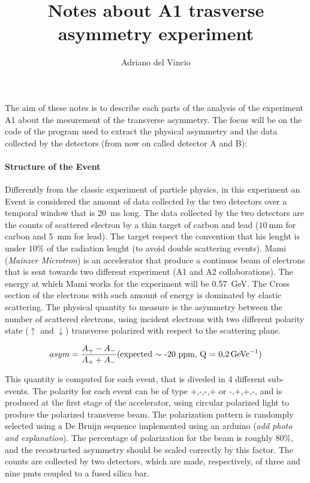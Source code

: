 \documentclass[10pt,a4paper]{article}
\author{Adriano del Vincio}
\title{Notes about A1 trasverse asymmetry experiment}
\begin{document}
\maketitle

\paragraph{}
The aim of these notes is to describe each parts of the analysis of the experiment A1 about the mesurement of the transverse asymmetry. The focus will be on the code of the program used to extract the physical asymmetry and  the data collected by the detectors (from now on called detector A and B): 


\paragraph{Structure of the Event}

Differently from the classic experiment of particle physics, in this experiment an Event is considered the amount of data collected by the two detectors over a temporal window that is \SI{20}{\milli\second} long. The data collected by the two detectors are the counts of scattered electron by a thin target of carbon and lead ($\SI{10}{\milli \meter}$ for carbon and \SI{5}{\milli \meter} for lead). The target respect the convention that his lenght is under $10\%$ of the radiation lenght (to avoid double scattering events). Mami (\textit{Mainzer Microtron}) is an accelerator that produce a continuos beam of electrons that is sent towards two different experiment (A1 and A2 collaborations). The energy at which Mami works for the experiment will be \SI{0.57}{\giga\electronvolt}. The Cross section of the electrons with such amount of energy is dominated by elastic scattering. The physical quantity to measure is the asymmetry between the number of scattered electrons, using incident electrons with two different polarity state ($\uparrow$ and $\downarrow$) transverse polarized with respect to the scattering plane. 

\begin{equation}
asym = \frac{A_{+} - A_{-}}{A_{+} + A_{-}} \text{(expected $\sim$ -20 ppm, Q = \SI{0.2}{\giga\electronvolt c^{-1}})}
\end{equation}

This quantity is computed for each event, that is diveded in 4 different sub-events. The polarity for each event can be of type +,-,-,+ or -,+,+,-, and is produced at the first stage of the accelerator, using circular polarized light to produce the polarized transverse beam. The polarization pattern is randomply selected using a De Bruijn sequence implemented using an arduino (\textit{add photo and explanation}). The percentage of polarization for the beam is roughly $80 \%$, and the recostructed asymmetry should be scaled correctly by this factor. The counts are collected by two detectors, which are made, respectively, of three and nine pmts coupled to a fused silica bar.  
\end{document}
